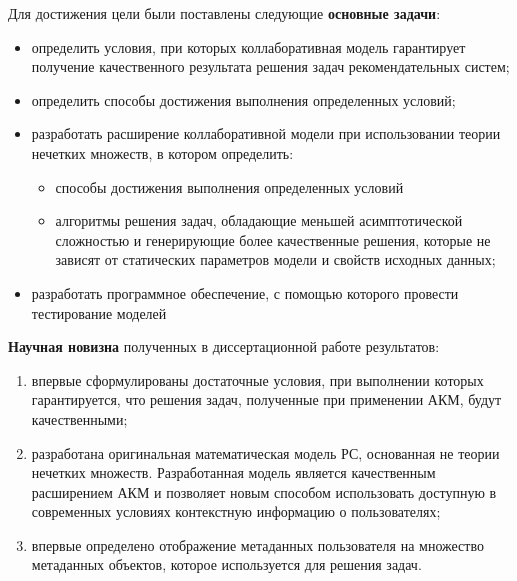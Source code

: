 Для достижения цели были поставлены следующие
{\bf основные задачи}:
\begin{itemize}
	\item определить условия, при которых коллаборативная модель гарантирует получение качественного результата решения задач рекомендательных систем;
	\item определить способы достижения выполнения определенных условий;
	\item разработать расширение коллаборативной модели при использовании теории нечетких множеств, в котором определить:
		\begin{itemize}
		\item способы достижения выполнения определенных условий
		\item алгоритмы решения задач, обладающие меньшей асимптотической сложностью и генерирующие более качественные решения, которые не зависят от статических параметров модели и свойств исходных данных;
		\end{itemize}
	\item разработать программное обеспечение, с помощью которого провести тестирование моделей
\end{itemize}

{\bf Научная новизна} полученных в диссертационной работе результатов:
\begin{enumerate}
\item впервые сформулированы достаточные условия, при выполнении которых гарантируется,
	что решения задач, полученные при применении АКМ,
	будут качественными;
\item разработана оригинальная математическая модель РС, основанная не теории
	нечетких множеств. Разработанная модель
	является качественным расширением АКМ и
	позволяет новым способом использовать доступную в современных
	условиях контекстную информацию о пользователях;
\item впервые определено отображение метаданных пользователя
	на множество метаданных объектов, которое используется для решения задач.
\end{enumerate}

